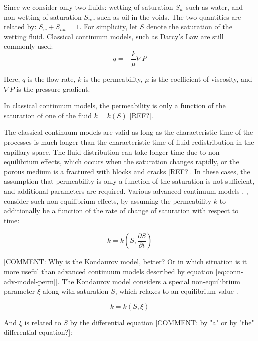\documentclass[
	12pt
] {article}
\begin{document}
	Since we consider only two fluids: wetting of saturation $S_w$ such as water, and non wetting of saturation $S_{nw}$ such as oil in the voids. The two quantities are related by: $S_{w} + S_{nw} = 1$. For simplicity, let $S$ denote the saturation of the wetting fluid. Classical continuum models, such as Darcy's Law \cite{darcy1856fontaines} are still commonly used:
	\begin{equation}
		q = -\frac{k}{\mu} \nabla P
	\end{equation}
	
	Here, $q$ is the flow rate, $k$ is the permeability, $\mu$ is the coefficient of viscosity, and $\nabla P$ is the pressure gradient.
	
	In classical continuum models, the permeability is only a function of the saturation of one of the fluid $k = k(S)$ [REF?].
	
	The classical continuum models are valid as long as the characteristic time of the processes is much longer than the characteristic time of fluid redistribution in the capillary space. The fluid distribution can take longer time due to non-equilibrium effects, which occurs when the saturation changes rapidly, or the porous medium is a fractured with blocks and cracks [REF?]. In these cases, the assumption that permeability is only a function of the saturation is not sufficient, and additional parameters are required. Various advanced continuum models \cite{hassanizadeh2004continuum}, \cite{hassanizadeh1987high}, \cite{barenblatt1960basic} consider such non-equilibrium effects, by assuming the permeability $k$ to additionally be a function of the rate of change of saturation with respect to time:
	
	\begin{equation} \label{eq:conn-adv-model-perm}
		k = k(S, \frac{\partial S}{\partial t})
	\end{equation}

	[COMMENT: Why is the Kondaurov model, better? Or in which situation is it more useful than advanced continuum models described by equation \ref{eq:conn-adv-model-perm}]. The Kondaurov model \cite{kondaurov2009non} considers a special non-equilibrium parameter $\xi$ along with saturation $S$, which relaxes to an equilibrium value \cite{kondaurov2007thermodynamically}.
	
	\begin{equation}
		k = k(S, \xi)
	\end{equation}
	
	And $\xi$ is related to $S$ by the differential equation [COMMENT: by "a" or by "the" differential equation?]:
	
\end{document}
